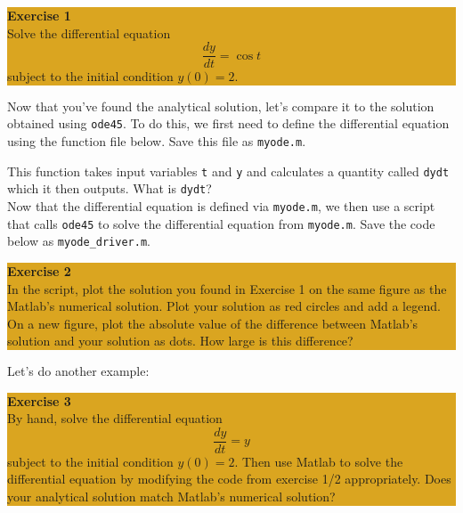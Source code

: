 \documentclass[12pt]{amsart}
\begin{document}
\begin{center}
\colorbox{Goldenrod}{\parbox{15cm}{
{
\textbf{\large Exercise 1}\vspace{1mm} \\
Solve the differential equation
\[
\frac{dy}{d t} = \cos t
\]
subject to the initial condition $y(0) = 2$.  
}}}
\end{center}
\vspace{.1in}
\noindent Now that you've found the analytical solution, let's compare it to the solution obtained using \verb+ode45+.  To do this, we first need to define the differential equation using the function file below.  Save this file as \verb+myode.m+.
\newpage




\noindent This function takes input variables \verb+t+ and \verb+y+ and calculates a quantity called \verb+dydt+ which it then outputs.  What is \verb+dydt+?   \\

\noindent Now that the differential equation is defined via \verb+myode.m+, we then use a script that calls \verb+ode45+ to solve the differential equation from \verb+myode.m+.  Save the code below as \verb+myode_driver.m+.



\vspace{.1in}
\begin{center}
\colorbox{Goldenrod}{\parbox{15cm}{
{
\textbf{\large Exercise 2}\vspace{1mm} \\
In the script, plot the solution you found in Exercise 1 on the same figure as the Matlab's numerical solution.  Plot your solution as red circles and add a legend.  On a new figure, plot the absolute value of the difference between Matlab's solution and your solution as dots.  How large is this difference?
}}}
\end{center}

\newpage
\noindent Let's do another example:
\vspace{.1in}
\begin{center}
\colorbox{Goldenrod}{\parbox{15cm}{
{
\textbf{\large Exercise 3}\vspace{1mm} \\
By hand, solve the differential equation
\[
\frac{dy}{d t} = y
\]
subject to the initial condition $y(0) = 2$.  Then use Matlab to solve the differential equation by modifying the code from exercise 1/2 appropriately.  Does your analytical solution match Matlab's numerical solution?  
}}}
\end{center}
\vspace{.1in}
\end{document}
